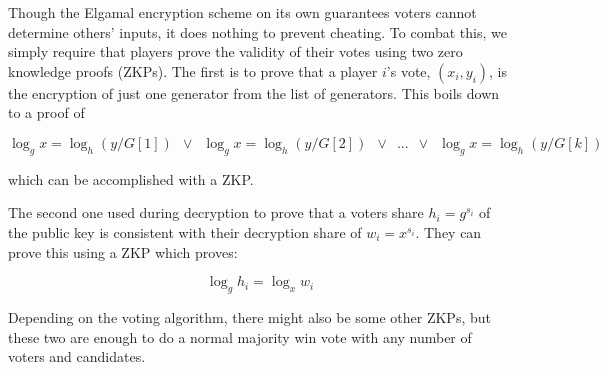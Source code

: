 \documentclass[11pt]{article}
\begin{document}
Though the Elgamal encryption scheme on its own guarantees voters cannot determine others' inputs, it does nothing to prevent cheating. To combat this, we simply require that players prove the validity of their votes using two zero knowledge proofs (ZKPs). The first is to prove that a player $i$'s vote, $(x_i, y_i)$, is the encryption of just one generator from the list of generators. This boils down to a proof of

$$\log_g x = \log_h (y/G[1]) \enspace \vee \enspace \log_g x = \log_h (y/G[2]) \enspace \vee \enspace ... \enspace \vee \enspace \log_g x = \log_h (y/G[k])$$

which can be accomplished with a ZKP.

The second one used during decryption to prove that a voters share $h_i = g^{s_i}$ of the public key is consistent with their decryption share of $w_i = x^{s_i}$. They can prove this using a ZKP which proves:

$$\log_g h_i = \log_x w_i$$

Depending on the voting algorithm, there might also be some other ZKPs, but these two are enough to do a normal majority win vote with any number of voters and candidates.
\end{document}
